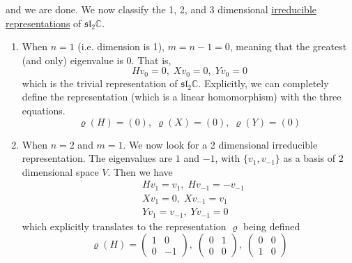   and we are done. We now classify the 1, 2, and 3 dimensional \hyperref[def:irreducible-representation-2]{irreducible representations} of $\mathfrak{sl}_2 \mathbb{C}$. 
  \begin{enumerate}
    \item When $n = 1$ (i.e. dimension is 1), $m = n-1 = 0$, meaning that the greatest (and only) eigenvalue is $0$. That is, 
      \begin{equation}
        H v_0 = 0,\; X v_0 = 0,\; Y v_0 = 0
      \end{equation}
    which is the trivial representation of $\mathfrak{sl}_2 \mathbb{C}$. Explicitly, we can completely define the representation (which is a linear homomorphism) with the three equations. 
    \begin{equation}
      \varrho(H) = (0),\; \varrho(X) = (0),\; \varrho(Y) = (0)
    \end{equation}

    \item When $n = 2$ and $m=1$. We now look for a 2 dimensional irreducible representation. The eigenvalues are $1$ and $-1$, with $\{v_1, v_{-1}\}$ as a basis of 2 dimensional space $V$. Then we have 
      \begin{align*}
        & Hv_1 = v_1, \; Hv_{-1} = - v_{-1} \\
        & X v_1 = 0, \; X v_{-1} = v_1 \\
        & Y v_1 = v_{-1}, \; Y v_{-1} = 0
      \end{align*}
    which explicitly translates to the representation $\varrho$ being defined
    \begin{equation}
      \varrho(H) = \begin{pmatrix}
      1&0\\0&-1
      \end{pmatrix}, \; \begin{pmatrix}
      0&1\\0&0
      \end{pmatrix}, \; \begin{pmatrix}
      0&0\\1&0
      \end{pmatrix}
    \end{equation}


\end{enumerate}
